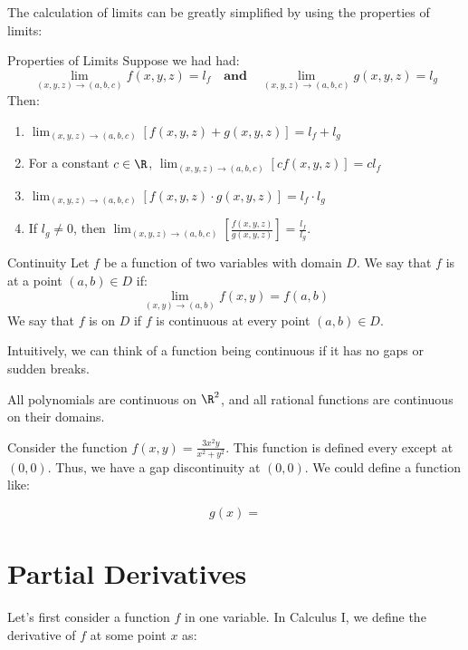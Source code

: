 \documentclass[math]{amznotes}
\begin{document}
The calculation of limits can be greatly simplified by using the properties of limits:
\begin{thmbox}{Properties of Limits}{}
    Suppose we had had:
    \[ \lim_{(x,y,z) \to (a,b,c)} f(x,y,z) = l_f \quad \textbf{and} \quad \lim_{(x,y,z) \to (a,b,c)} g(x,y,z) = l_g \]
    Then:
    \begin{enumerate}[noitemsep]
        \item $\lim_{(x,y,z) \to (a,b,c)} \left[ f(x,y,z) + g(x,y,z) \right] = l_f + l_g$
        \item For a constant $c \in \R$, $\lim_{(x,y,z) \to (a,b,c)} \left[ cf(x,y,z) \right] = cl_f$
        \item $\lim_{(x,y,z) \to (a,b,c)} \left[ f(x,y,z) \cdot g(x,y,z) \right] = l_f \cdot l_g$
        \item If $l_g \neq 0$, then $\lim_{(x,y,z) \to (a,b,c)} \left[ \frac{f(x,y,z)}{g(x,y,z)} \right] = \frac{l_f}{l_g}$.
    \end{enumerate}
\end{thmbox}

\begin{dfnbox}{Continuity}{}
    Let $f$ be a function of two variables with domain $D$. We say that $f$ is  at a point $(a,b) \in D$ if:
    \[ \lim_{(x,y) \to (a,b)} f(x,y) = f(a,b) \]
    We say that $f$ is  on $D$ if $f$ is continuous at every point $(a,b) \in D$.
\end{dfnbox}

Intuitively, we can think of a function being continuous if it has no gaps or sudden breaks.

\begin{notebox}
    All polynomials are continuous on $\R^2$, and all rational functions are continuous on their domains.
\end{notebox}

Consider the function $f(x,y) = \frac{3x^2y}{x^2+y^2}$. This function is defined every except at $(0,0)$. Thus, we have a gap discontinuity at $(0,0)$. We could define a function like:

\[ g(x) = \] 

\section{Partial Derivatives}

Let's first consider a function $f$ in one variable. In Calculus I, we define the derivative of $f$ at some point $x$ as:
\end{document}
